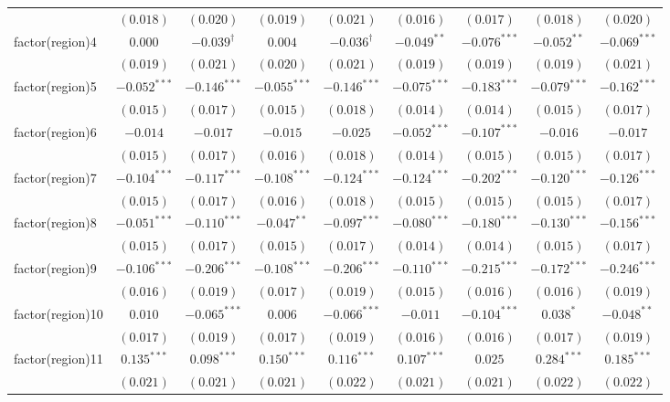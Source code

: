 \begin{landscape}
\begin{longtable}{lcccccccc}
 & $(0.018)$ & $(0.020)$ & $(0.019)$ & $(0.021)$ & $(0.016)$ & $(0.017)$ & $(0.018)$ & $(0.020)$ \\
factor(region)4 & $0.000$ & $-0.039^{\dagger}$ & $0.004$ & $-0.036^{\dagger}$ & $-0.049^{**}$ & $-0.076^{***}$ & $-0.052^{**}$ & $-0.069^{***}$ \\
 & $(0.019)$ & $(0.021)$ & $(0.020)$ & $(0.021)$ & $(0.019)$ & $(0.019)$ & $(0.019)$ & $(0.021)$ \\
factor(region)5 & $-0.052^{***}$ & $-0.146^{***}$ & $-0.055^{***}$ & $-0.146^{***}$ & $-0.075^{***}$ & $-0.183^{***}$ & $-0.079^{***}$ & $-0.162^{***}$ \\
 & $(0.015)$ & $(0.017)$ & $(0.015)$ & $(0.018)$ & $(0.014)$ & $(0.014)$ & $(0.015)$ & $(0.017)$ \\
factor(region)6 & $-0.014$ & $-0.017$ & $-0.015$ & $-0.025$ & $-0.052^{***}$ & $-0.107^{***}$ & $-0.016$ & $-0.017$ \\
 & $(0.015)$ & $(0.017)$ & $(0.016)$ & $(0.018)$ & $(0.014)$ & $(0.015)$ & $(0.015)$ & $(0.017)$ \\
factor(region)7 & $-0.104^{***}$ & $-0.117^{***}$ & $-0.108^{***}$ & $-0.124^{***}$ & $-0.124^{***}$ & $-0.202^{***}$ & $-0.120^{***}$ & $-0.126^{***}$ \\
 & $(0.015)$ & $(0.017)$ & $(0.016)$ & $(0.018)$ & $(0.015)$ & $(0.015)$ & $(0.015)$ & $(0.017)$ \\
factor(region)8 & $-0.051^{***}$ & $-0.110^{***}$ & $-0.047^{**}$ & $-0.097^{***}$ & $-0.080^{***}$ & $-0.180^{***}$ & $-0.130^{***}$ & $-0.156^{***}$ \\
 & $(0.015)$ & $(0.017)$ & $(0.015)$ & $(0.017)$ & $(0.014)$ & $(0.014)$ & $(0.015)$ & $(0.017)$ \\
factor(region)9 & $-0.106^{***}$ & $-0.206^{***}$ & $-0.108^{***}$ & $-0.206^{***}$ & $-0.110^{***}$ & $-0.215^{***}$ & $-0.172^{***}$ & $-0.246^{***}$ \\
 & $(0.016)$ & $(0.019)$ & $(0.017)$ & $(0.019)$ & $(0.015)$ & $(0.016)$ & $(0.016)$ & $(0.019)$ \\
factor(region)10 & $0.010$ & $-0.065^{***}$ & $0.006$ & $-0.066^{***}$ & $-0.011$ & $-0.104^{***}$ & $0.038^{*}$ & $-0.048^{**}$ \\
 & $(0.017)$ & $(0.019)$ & $(0.017)$ & $(0.019)$ & $(0.016)$ & $(0.016)$ & $(0.017)$ & $(0.019)$ \\
factor(region)11 & $0.135^{***}$ & $0.098^{***}$ & $0.150^{***}$ & $0.116^{***}$ & $0.107^{***}$ & $0.025$ & $0.284^{***}$ & $0.185^{***}$ \\
 & $(0.021)$ & $(0.021)$ & $(0.021)$ & $(0.022)$ & $(0.021)$ & $(0.021)$ & $(0.022)$ & $(0.022)$ \\

\end{longtable}
\end{landscape}
